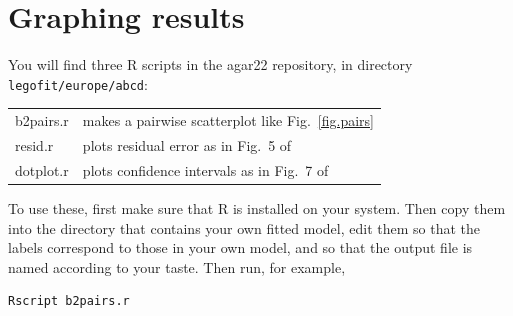 \documentclass[11pt]{article}
\begin{document}
\section{Graphing results}
\label{sec.graph}
You will find three R scripts in the agar22 repository, in directory
\texttt{legofit/europe/abcd}:
\begin{center}
  \begin{tabular}{ll}
  b2pairs.r & makes a pairwise scatterplot like
  Fig.~\ref{fig.pairs}\\
  resid.r & plots residual error as in Fig.~5 of \citep{Rogers:PCJ-2-e32}\\
  dotplot.r & plots confidence intervals as in Fig.~7 of
  \citep{Rogers:PCJ-2-e32}\\
  \end{tabular}
\end{center}
To use these, first make sure that R is installed on your system. Then
copy them into the directory that contains your own fitted model, edit
them so that the labels correspond to those in your own model, and so
that the output file is named according to your taste. Then run, for
example,
\begin{verbatim}
Rscript b2pairs.r
\end{verbatim}

\printbibliography
\end{document}
